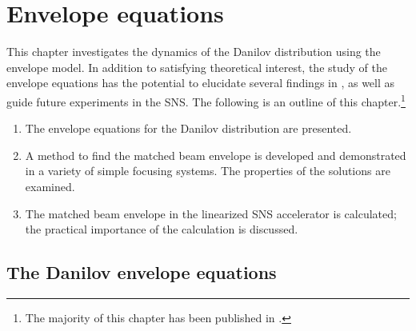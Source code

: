 \chapter{Envelope equations} \label{chap-2}

This chapter investigates the dynamics of the Danilov distribution using the envelope model. In addition to satisfying theoretical interest, the study of the envelope equations has the potential to elucidate several findings in \cite{Holmes2018}, as well as guide future experiments in the SNS. The following is an outline of this chapter.\footnote{The majority of this chapter has been published in \cite{Hoover2021}.}
%
\begin{enumerate}
    \item{The envelope equations for the Danilov distribution are presented.}
    \item{A method to find the matched beam envelope is developed and demonstrated in a variety of simple focusing systems. The properties of the solutions are examined.}
    \item{The matched beam envelope in the linearized SNS accelerator is calculated; the practical importance of the calculation is discussed.}
\end{enumerate}
%



\section{The Danilov envelope equations}

